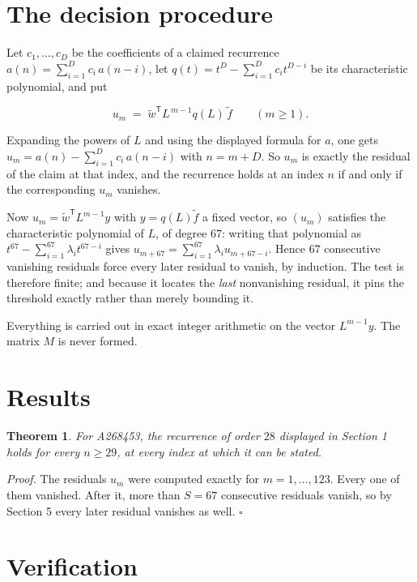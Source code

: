 \documentclass[11pt]{article}
\newtheorem{theorem}{Theorem}
\theoremstyle{definition}
\begin{document}
\section{The decision procedure}

Let $c_1,\dots,c_D$ be the coefficients of a claimed recurrence $a(n) = \sum_{i=1}^{D} c_i\,a(n-i)$, let $q(t) = t^{D} - \sum_{i=1}^{D} c_i t^{D-i}$ be its characteristic polynomial, and put

\[u_m \;=\; \tilde w^{\mathsf T} L^{\,m-1} q(L)\,\tilde f \qquad (m \ge 1).\]

Expanding the powers of $L$ and using the displayed formula for $a$, one gets $u_m = a(n) - \sum_{i=1}^{D} c_i\,a(n-i)$ with $n = m + D$. So $u_m$ is exactly the residual of the claim at that index, and the recurrence holds at an index $n$ if and only if the corresponding $u_m$ vanishes.

Now $u_m = \tilde w^{\mathsf T} L^{m-1} y$ with $y = q(L)\tilde f$ a fixed vector, so $(u_m)$ satisfies the characteristic polynomial of $L$, of degree $67$: writing that polynomial as $t^{67} - \sum_{i=1}^{67} \lambda_i t^{67-i}$ gives $u_{m+67} = \sum_{i=1}^{67} \lambda_i u_{m+67-i}$. Hence $67$ consecutive vanishing residuals force every later residual to vanish, by induction. The test is therefore finite; and because it locates the {\itshape last} nonvanishing residual, it pins the threshold exactly rather than merely bounding it.

Everything is carried out in exact integer arithmetic on the vector $L^{m-1}y$. The matrix $M$ is never formed.

\section{Results}

\begin{theorem} For A268453, the recurrence of order $28$ displayed in Section 1 holds for every $n \ge 29$, at every index at which it can be stated.\end{theorem}

{\itshape Proof.} The residuals $u_m$ were computed exactly for $m = 1,\dots,123$. Every one of them vanished. After it, more than $S = 67$ consecutive residuals vanish, so by Section 5 every later residual vanishes as well. $\square$

\section{Verification}
\end{document}
